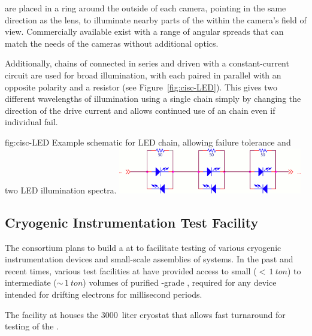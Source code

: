  are placed in a ring around the outside of each
camera, pointing in the same direction as the lens, to 
illuminate nearby parts of the  within the camera's field of
view. Commercially available  exist with
a range of angular spreads that can match the needs of the
cameras without additional optics.

Additionally, chains of  connected in series and driven with a
constant-current circuit are used for broad illumination, with each
 paired in parallel with an opposite polarity  and a resistor
(see Figure~\ref{fig:cisc-LED}).
This gives two different wavelengths of illumination using a single chain simply by changing the direction of the drive current and allows continued use of an  chain even if individual  fail.

\begin{dunefigure}{fig:cisc-LED}
  {Example schematic for LED chain, allowing failure tolerance and two LED illumination spectra.}
  \includegraphics[width=0.6\textwidth]{graphics/cisc_led.png}
\end{dunefigure}


\subsection{Cryogenic Instrumentation Test Facility}
The  consortium plans to build a  at  to facilitate testing of various cryogenic instrumentation devices and small-scale assemblies of  systems. 
In the past and recent times, various test facilities at  have provided access to small ($<\,\SI{1}{ton}$) to intermediate ($\sim\,\SI{1}{ton}$) volumes of purified -grade , required for %
any device intended for drifting electrons for millisecond periods. 

The  facility at  houses the  \SI {3000} {liter} cryostat that allows fast turnaround for testing of the  . 

